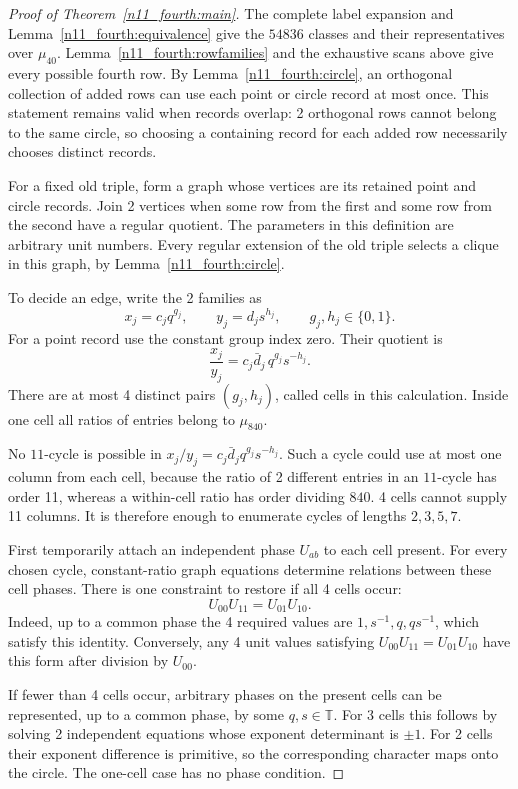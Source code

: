 \documentclass[11pt,a4paper]{article}
\theoremstyle{plain}
\theoremstyle{definition}
\theoremstyle{plain}
\begin{document}
\begin{proof}[Proof of Theorem~\ref{n11_fourth:main}]
The complete label expansion and Lemma~\ref{n11_fourth:equivalence} give the $54836$ classes and their representatives over $\mu_{40}$. Lemma~\ref{n11_fourth:rowfamilies} and the exhaustive scans above give every possible fourth row. By Lemma~\ref{n11_fourth:circle}, an orthogonal collection of added rows can use each point or circle record at most once. This statement remains valid when records overlap: 2 orthogonal rows cannot belong to the same circle, so choosing a containing record for each added row necessarily chooses distinct records.

\medskip
For a fixed old triple, form a graph whose vertices are its retained point and circle records. Join 2 vertices when some row from the first and some row from the second have a regular quotient. The parameters in this definition are arbitrary unit numbers. Every regular extension of the old triple selects a clique in this graph, by Lemma~\ref{n11_fourth:circle}.

To decide an edge, write the 2 families as
$$x_j=c_j q^{g_j},\qquad y_j=d_j s^{h_j},
\qquad g_j,h_j\in\{0,1\}.$$
For a point record use the constant group index zero. Their quotient is
\[
\frac{x_j}{y_j}=c_j\bar d_j\,q^{g_j}s^{-h_j}.
\]
There are at most 4 distinct pairs $(g_j,h_j)$, called cells in this calculation. Inside one cell all ratios of entries belong to $\mu_{840}$.

No $11$-cycle is possible in $x_j/y_j=c_j\bar d_jq^{g_j}s^{-h_j}$. Such a cycle could use at most one column from each cell, because the ratio of 2 different entries in an $11$-cycle has order 11, whereas a within-cell ratio has order dividing $840$. 4 cells cannot supply 11 columns. It is therefore enough to enumerate cycles of lengths $2,3,5,7$.

First temporarily attach an independent phase $U_{ab}$ to each cell present. For every chosen cycle, constant-ratio graph equations determine relations between these cell phases. There is one constraint to restore if all 4 cells occur:
\[
U_{00}U_{11}=U_{01}U_{10}.
\]
Indeed, up to a common phase the 4 required values are $1,s^{-1},q,qs^{-1}$, which satisfy this identity. Conversely, any 4 unit values satisfying $U_{00}U_{11}=U_{01}U_{10}$ have this form after division by $U_{00}$.

If fewer than 4 cells occur, arbitrary phases on the present cells can be represented, up to a common phase, by some $q,s\in\mathbb T$. For 3 cells this follows by solving 2 independent equations whose exponent determinant is $\pm1$. For 2 cells their exponent difference is primitive, so the corresponding character maps onto the circle. The one-cell case has no phase condition.


\end{proof}
\end{document}
